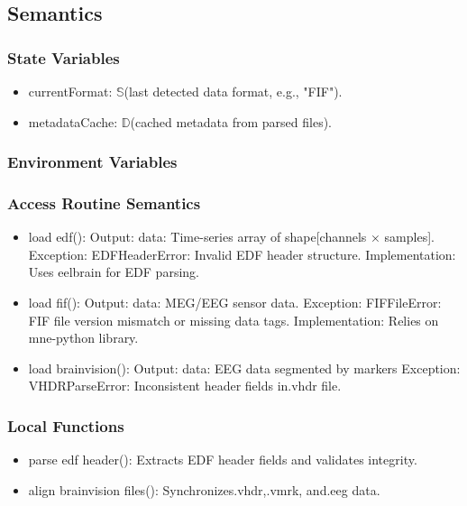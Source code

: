 \documentclass[12pt, titlepage]{article}
\begin{document}
\subsection{Semantics}

\subsubsection{State Variables}

\begin{itemize}
\item currentFormat: $\mathbb{S}$(last detected data format, e.g., "FIF").


\item metadataCache: $\mathbb{D}$(cached metadata from parsed files).


\end{itemize}


\subsubsection{Environment Variables}


\subsubsection{Access Routine Semantics}
\begin{itemize}
  \item load edf():
    \subitem Output:
        \subsubitem data: Time-series array of shape[channels × samples].
    \subitem Exception:
        \subsubitem EDFHeaderError: Invalid EDF header structure.
    \subitem Implementation: Uses eelbrain for EDF parsing.
  \item load fif():
    \subitem Output:
        \subsubitem data: MEG/EEG sensor data.
    \subitem Exception:
        \subsubitem FIFFileError: FIF file version mismatch or missing data tags.
    \subitem Implementation: Relies on mne-python library.
  \item load brainvision():
    \subitem Output:
        \subsubitem data: EEG data segmented by markers
    \subitem Exception:
        \subsubitem VHDRParseError: Inconsistent header fields in.vhdr file.
\end{itemize}


\subsubsection{Local Functions}
\begin{itemize}
\item parse edf header(): Extracts EDF header fields and validates integrity.\\
\item align brainvision files(): Synchronizes.vhdr,.vmrk, and.eeg data.
\end{itemize}
\end{document}
